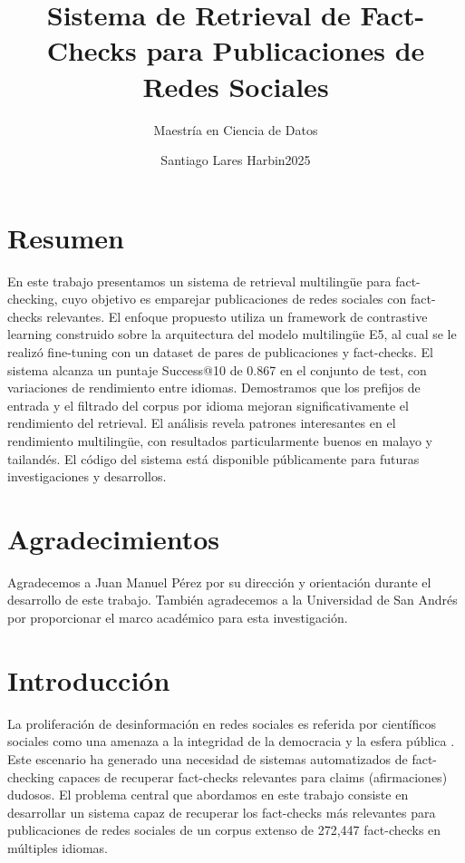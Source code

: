 \documentclass[a4paper,openany]{memoir}
\title{Sistema de Retrieval de Fact-Checks para Publicaciones de Redes Sociales}
\subtitle{Maestría en Ciencia de Datos}
\author{Santiago Lares Harbin\hfill 2025}
\begin{document}
\frontmatter

\mnfrontpage

\chapter{Resumen}

En este trabajo presentamos un sistema de retrieval multilingüe para fact-checking, cuyo objetivo es emparejar publicaciones de redes sociales con fact-checks relevantes. El enfoque propuesto utiliza un framework de contrastive learning construido sobre la arquitectura del modelo multilingüe E5, al cual se le realizó fine-tuning con un dataset de pares de publicaciones y fact-checks. El sistema alcanza un puntaje Success@10 de 0.867 en el conjunto de test, con variaciones de rendimiento entre idiomas. Demostramos que los prefijos de entrada y el filtrado del corpus por idioma mejoran significativamente el rendimiento del retrieval. El análisis revela patrones interesantes en el rendimiento multilingüe, con resultados particularmente buenos en malayo y tailandés. El código del sistema está disponible públicamente para futuras investigaciones y desarrollos.

\chapter{Agradecimientos}

Agradecemos a Juan Manuel Pérez por su dirección y orientación durante el desarrollo de este trabajo. También agradecemos a la Universidad de San Andrés por proporcionar el marco académico para esta investigación.

\cleartorecto
{}
\tableofcontents
\cleartorecto
{}

\mainmatter

\chapter{Introducción}

La proliferación de desinformación en redes sociales es referida por científicos sociales como una amenaza a la integridad de la democracia y la esfera pública \cite{chambers2021truth, lewandowsky2023misinformation}. %
Este escenario ha generado una necesidad %
 de sistemas automatizados de fact-checking capaces de recuperar fact-checks relevantes para claims (afirmaciones) dudosos. El problema central que abordamos en este trabajo consiste en desarrollar un sistema capaz de recuperar los fact-checks más relevantes para publicaciones de redes sociales de un corpus extenso de 272,447 fact-checks en múltiples idiomas. 
\end{document}
